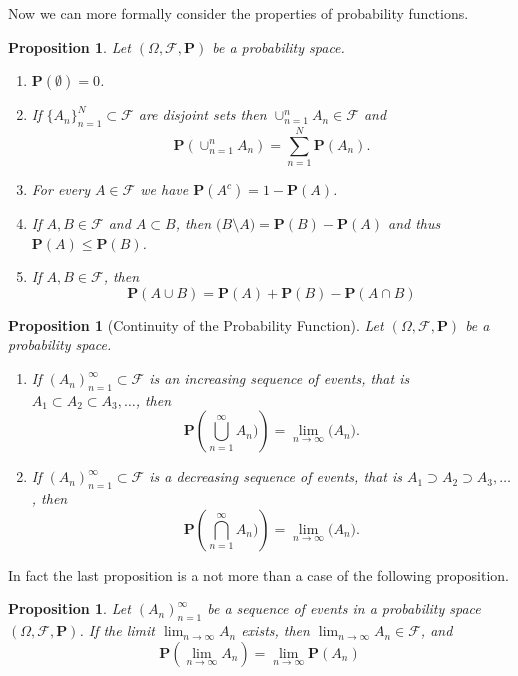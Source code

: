 \documentclass[11pt,a4paper]{article}
\theoremstyle{definition}
\theoremstyle{plain}
\newtheorem{proposition}[theorem]{Proposition}
\begin{document}
  Now we can more formally consider the properties of probability functions.
  \begin{proposition}
    Let $(\Omega, \mathcal F, \mathbf P)$ be a probability space.
    \begin{enumerate}
      \item $\mathbf P(\emptyset) = 0$.
      \item If $\{A_n\}_{n=1}^{N} \subset \mathcal F$ are disjoint sets then
        $\cup_{n=1}^{n}{A_n} \in \mathcal F$ and
        \[
          \mathbf P\left(\cup_{n=1}^{n}{A_n}\right) = 
          \sum_{n=1}^{N}{\mathbf P(A_n)}.
        \]
      \item For every $A \in \mathcal F$ we have 
        $\mathbf P(A^c) = 1 - \mathbf P(A)$.
      \item If $A, B \in \mathcal F$ and $A \subset B$, then 
        $\mathbf(B \setminus A) = \mathbf P(B) - \mathbf P(A)$ and thus
        $\mathbf P(A) \le \mathbf P(B)$.
      \item If $A,B \in \mathcal F$, then
        \[
          \mathbf P(A \cup B) = 
          \mathbf P(A) + \mathbf P(B) - \mathbf P(A \cap B)
        \]
    \end{enumerate}
  \end{proposition}
  
  \begin{proposition}[Continuity of the Probability Function]
    Let $(\Omega, \mathcal F, \mathbf P)$ be a probability space.
    \begin{enumerate}
      \item If $(A_n)_{n=1}^{\infty} \subset \mathcal F$ is an increasing
        sequence of events, that is $A_1 \subset A_2 \subset A_3, \dots$,
        then
        \[
          \mathbf P\left(\bigcup_{n=1}^{\infty}{A_n})\right) = 
          \lim_{n \to \infty}{\mathbf (A_n)}.
        \]
      \item If $(A_n)_{n=1}^{\infty} \subset \mathcal F$ is a decreasing
        sequence of events, that is $A_1 \supset A_2 \supset A_3, \dots$,
        then
        \[
          \mathbf P\left(\bigcap_{n=1}^{\infty}{A_n})\right) = 
          \lim_{n \to \infty}{\mathbf (A_n)}.
        \]
    \end{enumerate}
  \end{proposition}

  In fact the last proposition is a not more than a case of the following
  proposition.

  \begin{proposition}
    Let $(A_n)_{n=1}^{\infty}$ be a sequence of events in a probability space
    $(\Omega, \mathcal F, \mathbf P)$. If the limit $\lim_{n \to \infty} A_n$
    exists, then $\lim_{n \to \infty} A_n \in \mathcal F$, and
    \[
      \mathbf P(\lim_{n \to \infty}{A_n}) = 
      \lim_{n \to \infty} \mathbf P(A_n)
    \]
  \end{proposition}
  
\end{document}
